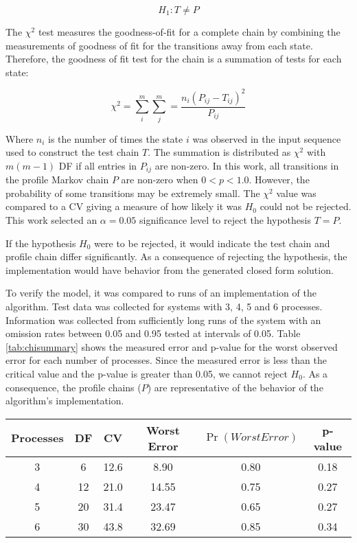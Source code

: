 \begin{equation} H_{1}: T \neq P \end{equation}

The $\chi^2$ test measures the goodness-of-fit for a complete chain by combining the measurements of goodness of fit for the transitions away from each state.
Therefore, the goodness of fit test for the chain is a summation of tests for each state:\cite{MARKOV3}

\begin{equation} \chi^2 = \sum_{i}^{m} \sum_{j}^{m} = \frac{n_{i}(P_{ij}-T_{ij})^2}{P_{ij}} \end{equation}

Where $n_{i}$ is the number of times the state $i$ was observed in the input sequence used to construct the test chain $T$.
The summation is distributed as $\chi^2$ with $m(m-1)$ \ac{DF} if all entries in $P_{ij}$ are non-zero.
In this work, all transitions in the profile Markov chain $P$ are non-zero when $0<p<1.0$.
However, the probability of some transitions may be extremely small.
The $\chi^2$ value was compared to a \ac{CV} giving a measure of how likely it was $H_{0}$ could not be rejected.
This work selected an $\alpha = 0.05$ significance level to reject the hypothesis $T=P$.

If the hypothesis $H_{0}$ were to be rejected, it would indicate the test chain and profile chain differ significantly.
As a consequence of rejecting the hypothesis, the implementation would have behavior from the generated closed form solution.

To verify the model, it was compared to runs of an implementation of the algorithm.
Test data was collected for systems with 3, 4, 5 and 6 processes.
Information was collected from sufficiently long runs of the system with an omission rates between 0.05 and 0.95 tested at intervals of 0.05.
Table \ref{tab:chisummary} shows the measured error and p-value for the worst observed error for each number of processes.
Since the measured error is less than the critical value and the p-value is greater than 0.05, we cannot reject $H_0$. 
As a consequence, the profile chains ($P$) are representative of the behavior of the algorithm's implementation.

\begin{table*}[!t]
\centering
\begin{tabular}{ c | c c c c c}
  \hline
  Processes & DF & CV & Worst Error & $\Pr(WorstError)$ &  p-value \\ \hline
  3 & 6 & 12.6 & 8.90 & 0.80 & 0.18 \\
  4 & 12 & 21.0 & 14.55 & 0.75 & 0.27 \\
  5 & 20 & 31.4 & 23.47 & 0.65 & 0.27 \\
  6 & 30 & 43.8 & 32.69 & 0.85 & 0.34 \\
\end{tabular}
\caption{Summary of $\chi^2$ tests performed.}
\label{tab:chisummary}
\end{table*}

